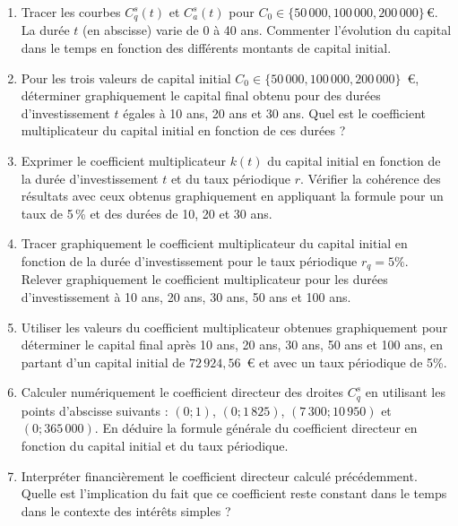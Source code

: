 \documentclass{article}
\begin{document}
\begin{enumerate}[label=\textbf{Q\arabic*.}]
    \item Tracer les courbes \( C^s_q(t) \) et \( C^s_a(t) \) pour \( C_0 \in \{50\,000, 100\,000, 200\,000\} \, \text{€} \). La durée \( t \) (en abscisse) varie de 0 à 40 ans. Commenter l'évolution du capital dans le temps en fonction des différents montants de capital initial.

    \item Pour les trois valeurs de capital initial \( C_0 \in \{50\,000, 100\,000, 200\,000\} \)~€, déterminer graphiquement le capital final obtenu pour des durées d'investissement \( t \) égales à 10 ans, 20 ans et 30 ans. Quel est le coefficient multiplicateur du capital initial en fonction de ces durées ?

    \item Exprimer le coefficient multiplicateur \( k(t) \) du capital initial en fonction de la durée d'investissement \( t \) et du taux périodique \( r \). Vérifier la cohérence des résultats avec ceux obtenus graphiquement en appliquant la formule pour un taux de 5\,\% et des durées de 10, 20 et 30 ans.

    \item Tracer graphiquement le coefficient multiplicateur du capital initial en fonction de la durée d'investissement pour le taux périodique $r_q = 5\%$. Relever graphiquement le coefficient multiplicateur pour les durées d'investissement à 10 ans, 20 ans, 30 ans, 50 ans et 100 ans.

    \item Utiliser les valeurs du coefficient multiplicateur obtenues graphiquement pour déterminer le capital final après 10 ans, 20 ans, 30 ans, 50 ans et 100 ans, en partant d'un capital initial de $72\,924,56$\ € et avec un taux périodique de 5\%.

    \item Calculer numériquement le coefficient directeur des droites \( C^s_q \) en utilisant les points d'abscisse suivants : \( (0; 1) \), \( (0; 1\,825) \), \( (7\,300; 10\,950) \) et \( (0; 365\,000) \). En déduire la formule générale du coefficient directeur en fonction du capital initial et du taux périodique.

    \item Interpréter financièrement le coefficient directeur calculé précédemment. Quelle est l'implication du fait que ce coefficient reste constant dans le temps dans le contexte des intérêts simples ?

\end{enumerate}
\end{document}
